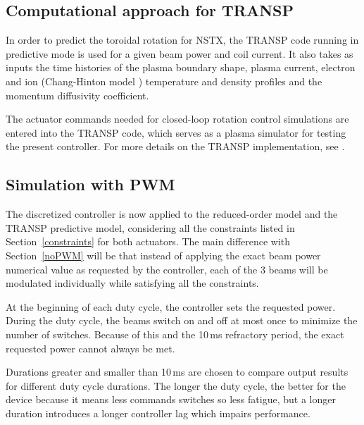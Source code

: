 \documentclass{iopart}
\begin{document}
\subsection{Computational approach for TRANSP}
In order to predict the toroidal rotation for NSTX, the TRANSP code running in predictive mode is used for a given beam power and coil current. It also takes as inputs the time histories of the plasma boundary shape, plasma current, electron and ion (Chang-Hinton model \cite{Changhinton}) temperature and density profiles and the momentum diffusivity coefficient.

The actuator commands needed for closed-loop rotation control simulations are entered into the TRANSP code, which serves as a plasma simulator for testing the present controller. For more details on the TRANSP implementation, see \cite{Boyer15}.

\subsection{Simulation with PWM}
The discretized controller is now applied to the reduced-order model and the TRANSP predictive model, considering all the constraints listed in Section~\ref{constraints} for both actuators. The main difference with Section~\ref{noPWM} will be that instead of applying the exact beam power numerical value as requested by the controller, each of the 3 beams will be modulated individually while satisfying all the constraints.

At the beginning of each duty cycle, the controller sets the requested power. During the duty cycle, the beams switch on and off at most once to minimize the number of switches. Because of this and the 10\,ms refractory period, the exact requested power cannot always be met.

Durations greater and smaller than 10\,ms are chosen to compare output results for different duty cycle durations. The longer the duty cycle, the better for the device because it means less commands switches so less fatigue, but a longer duration introduces a longer controller lag which impairs performance.
  
\end{document}
